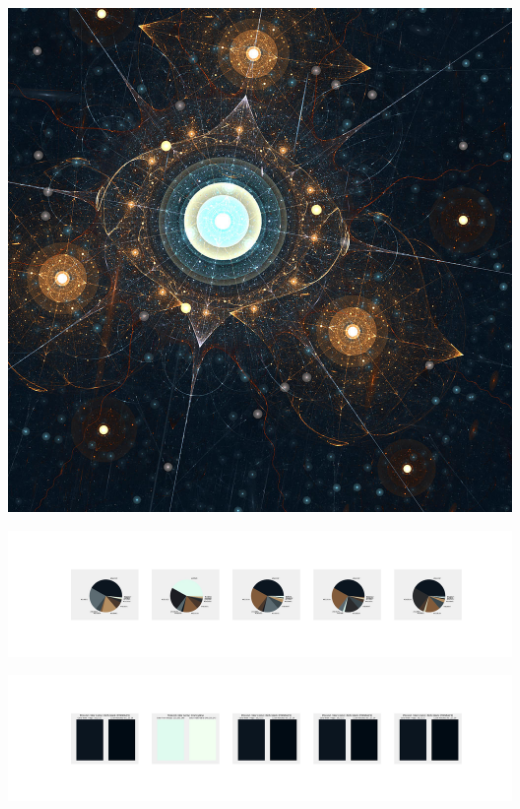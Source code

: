 \documentclass[11pt]{article}
\begin{document}
\begin{landscape}
    \begin{center}
    \includegraphics[width=\textwidth]{./nbimg/file (225).jpg}
    \end{center}

    \begin{center}
    \includegraphics[width=250mm]{./nbimg/pie-140.jpg}
    \end{center}

    \begin{center}
    \includegraphics[width=250mm]{./nbimg/peak-140.jpg}
    \end{center}
    


\end{landscape}
\end{document}
